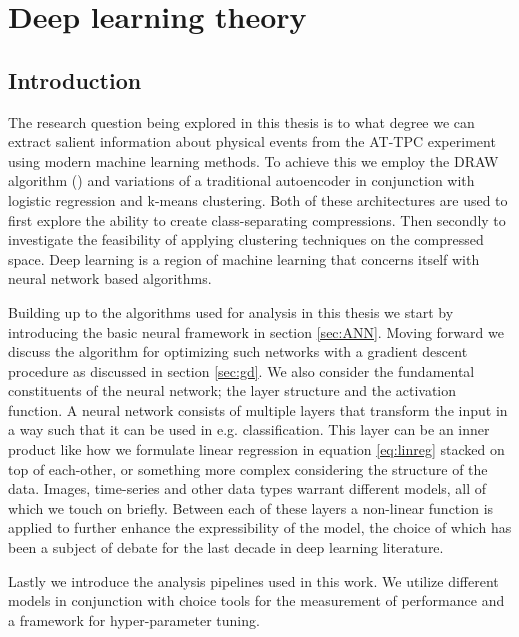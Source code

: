 \chapter{Deep learning theory}\label{ch:ml}
\section{Introduction}

The research question being explored in this thesis is to what degree we can extract salient information about physical events from the AT-TPC experiment using modern machine learning methods. To achieve this we employ the DRAW algorithm (\cite{Gregor2015}) and variations of a traditional autoencoder in conjunction with logistic regression and k-means clustering. Both of these architectures are used to first explore the ability to create class-separating compressions. Then secondly to investigate the feasibility of applying clustering techniques on the compressed space. Deep learning is a region of machine learning that concerns itself with neural network based algorithms. 

Building up to the algorithms used for analysis in this thesis we start by introducing the basic neural framework in section \ref{sec:ANN}. Moving forward we discuss the algorithm for optimizing such networks with a gradient descent procedure as discussed in section \ref{sec:gd}. We also consider the fundamental constituents of the neural network; the layer structure and the activation function. A neural network consists of multiple layers that transform the input in a way such that it can be used in e.g. classification. This layer can be an inner product like how we formulate linear regression in equation \ref{eq:linreg} stacked on top of each-other, or something more complex considering the structure of the data. Images, time-series and other data types warrant different models, all of which we touch on briefly. Between each of these layers a non-linear function is applied to further enhance the expressibility of the model, the choice of which has been a subject of debate for the last decade in deep learning literature.

Lastly we introduce the analysis pipelines used in this work. We utilize different models in conjunction with choice tools for the measurement of performance and a framework for hyper-parameter tuning. 